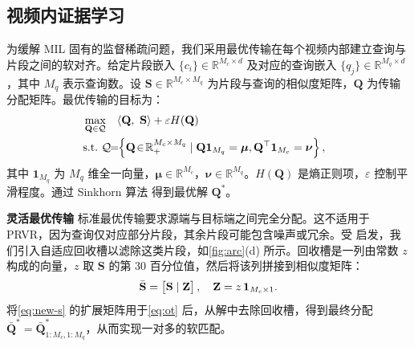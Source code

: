 \subsection{视频内证据学习}
为缓解 MIL 固有的监督稀疏问题，我们采用最优传输在每个视频内部建立查询与片段之间的软对齐。给定片段嵌入 $\{c_i\} \in \mathbb{R}^{M_c \times d}$ 及对应的查询嵌入 $\{q_j\} \in \mathbb{R}^{M_q \times d}$，其中 $M_q$ 表示查询数。设 $\mathbf{S} \in \mathbb{R}^{M_c \times M_q}$ 为片段与查询的相似度矩阵，$\mathbf{Q}$ 为传输分配矩阵。最优传输的目标为：
\vspace{-.6em}
\begin{equation}
\vspace{-.6em}
  \begin{aligned}
 \!\!\!\!&\max _{\mathbf{Q} \in \mathcal{Q}} \quad
 \langle\mathbf{Q},~ \mathbf{S}\rangle +\varepsilon H(\mathbf{Q})\\
\!\!\!\!&\text{s.t.}  \quad\!\!\!\!
\mathcal{Q}\!\!=\!\!\left\{\mathbf{Q}\! \in \!\mathbb{R}_{+}^{M_c \times M_q}\mid \mathbf{Q} \mathbf{1}_{M_q}=\boldsymbol{\mu}, \mathbf{Q}^{\top} \mathbf{1}_{M_c}= \boldsymbol{\nu} \right\},
\vspace{-.6em}
\end{aligned}
\label{eq:ot}
\end{equation}
其中 $\mathbf{1}_{M_q}$ 为 $M_q$ 维全一向量，$\boldsymbol{\mu}\in \mathbb{R}^{M_c}$，$\boldsymbol{\nu}\in \mathbb{R}^{M_q}$。$H(\mathbf{Q})$ 是熵正则项，$\varepsilon$ 控制平滑程度。通过 Sinkhorn 算法\citep{sinkhorn} 得到最优解 $\mathbf{Q}^*$。

\noindent \textbf{灵活最优传输} \quad
标准最优传输要求源端与目标端之间完全分配。这不适用于 PRVR，因为查询仅对应部分片段，其余片段可能包含噪声或冗余。受\cite{superglue,Nortorn} 启发，我们引入自适应回收槽以滤除这类片段，如\cref{fig:arc}(d) 所示。回收槽是一列由常数 $z$ 构成的向量，$z$ 取 $\mathbf{S}$ 的第 30 百分位值，然后将该列拼接到相似度矩阵：
\vspace{-.5em}
\begin{equation}
\bar{\mathbf{S}} = 
\begin{bmatrix}
\mathbf{S}\mid \mathbf{Z}
\end{bmatrix}, \quad
\mathbf{Z} = z \, \mathbf{1}_{{M_c} \times 1}.
\label{eq:new-s}
\vspace{-.5em}
\end{equation}
将\cref{eq:new-s} 的扩展矩阵用于\cref{eq:ot} 后，从解中去除回收槽，得到最终分配 $ {\bar{\mathbf{Q}}}^*= \bar{\mathbf{Q}}^*_{1: M_{c},1:{M_q}}$，从而实现一对多的软匹配。

